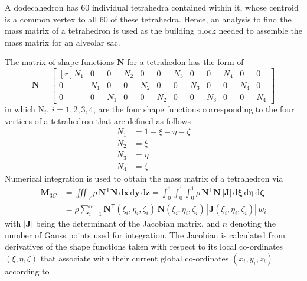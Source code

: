 A dodecahedron has 60 individual tetrahedra contained within it, whose centroid is a common vertex to all 60 of these tetrahedra. Hence, an analysis to find the mass matrix of a tetrahedron is used as the building block needed to assemble the mass matrix for an alveolar sac.

The matrix of shape functions $\mathbf{N}$ for a tetrahedon has the form of
\begin{equation}
\mathbf{N} =  
\begin{bmatrix*}[r]
N_1 & 0 & 0 & N_2 & 0 & 0 & N_3 & 0 & 0 & N_4 & 0 & 0 \\
0 & N_1 & 0 & 0 & N_2 & 0 & 0 & N_3 & 0 & 0 & N_4 & 0 \\
0 & 0 & N_1 & 0 & 0 & N_2 & 0 & 0 & N_3 & 0 & 0 & N_4
\end{bmatrix*} 
\label{shape3D}
\end{equation}
in which $\mathrm{N}_i$, $i = 1, 2, 3, 4$, are the four shape functions corresponding to the four vertices of a tetrahedron that are defined as follows
\begin{subequations}
	\begin{align}
	N_1 & = 1 - \xi - \eta - \zeta \\
	N_2 & = \xi \\
	N_3 & = \eta \\
	N_4 & = \zeta .
	\end{align}
\end{subequations}
Numerical integration is used to obtain the mass matrix of a tetrahedron via
\begin{equation}
\begin{aligned}
\mathbf{M}_{3C} & = \iiint_V \rho \, \mathbf{N}^{\mathsf{T}} \mathbf{N} \, \mathrm{d} \mathbf{x} \, \mathrm{d} \mathbf{y} \, \mathrm{d} \mathbf{z} = \int_0^1 \int_0^1 \int_0^1 \rho \, \mathbf{N}^{\mathsf{T}} \mathbf{N} \, | \mathbf{J} | \, \mathrm{d} \mathbf{\xi} \, \mathrm{d} \mathbf{\eta} \, \mathrm{d} \mathbf{\zeta} \\ & = \rho \sum_{i=1}^n \mathbf{N}^{\mathsf{T}} ( \xi_i , \eta_i , \zeta_i ) \, \mathbf{N} (\xi_i , \eta_i , \zeta_i ) \, |\mathbf{J} (\xi_i , \eta_i , \zeta_i )| \, w_i
\end{aligned}
\end{equation}
with $|\mathbf{J}|$ being the determinant of the Jacobian matrix, and $n$ denoting the number of Gauss points used for integration.  The Jacobian is calculated from derivatives of the shape functions taken with respect to its local co-ordinates $(\xi, \eta, \zeta)$ that associate with their current global co-ordinates $(x_i, y_i, z_i)$ according to
